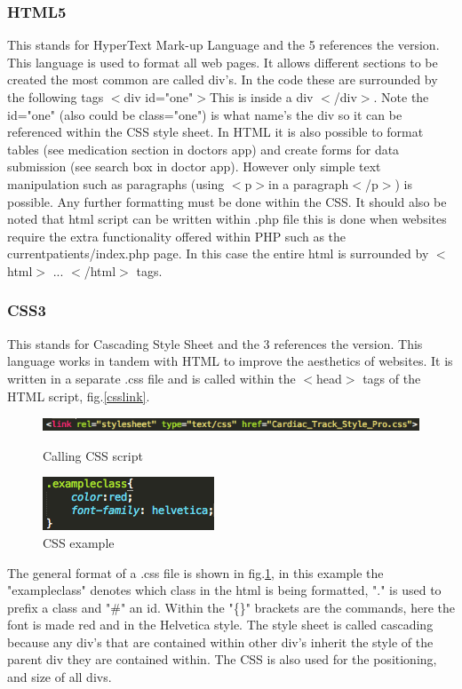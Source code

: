 \documentclass[11pt]{article}
\begin{document}
\subsubsection{HTML5}
This stands for HyperText Mark-up Language and the 5 references the version. This language is used to format all web pages. It allows different sections to be created the most common are called div's. In the code these are surrounded by the following tags $<$div id="one"$>$This is inside a div $<$/div$>$. Note the id="one" (also could be class="one") is what name's the div so it can be referenced within the CSS style sheet. In HTML it is also possible to format tables (see medication section in doctors app) and create forms for data submission (see search box in doctor app). However only simple text manipulation such as paragraphs (using $<$p$>$in a paragraph$<$/p$>$) is possible. Any further formatting must be done within the CSS. It should also be noted that html script can be written within .php file this is done when websites require the extra functionality offered within PHP such as the currentpatients/index.php page. In this case the entire html is surrounded by $<$html$>$ ... $<$/html$>$ tags. 
\subsubsection{CSS3}
This stands for Cascading Style Sheet and the 3 references the version. This language works in tandem with HTML to improve the aesthetics of websites. It is written in a separate .css file and is called within the $<$head$>$ tags of the HTML script, fig.\ref{csslink}. 
\begin{figure}[h!] 
\includegraphics[width=\linewidth]{csslink.png}
\caption{Calling CSS script \label{csslink}}
\endminipage\hfill
{}
\includegraphics[width=\linewidth]{exampleclass.png}
\caption{CSS example \label{CSSex}}
\endminipage
\end{figure} 
The general format of a .css file is shown in fig.\ref{CSSex}, in this example the "exampleclass" denotes which class in the html is being formatted, "." is used to prefix a class and "\#" an id. Within the "\{\}" brackets are the commands, here the font is made red and in the Helvetica style. The style sheet is called cascading because any div's that are contained within other div's inherit the style of the parent div they are contained within. The CSS is also used for the positioning, and size of all divs. 
\end{document}
